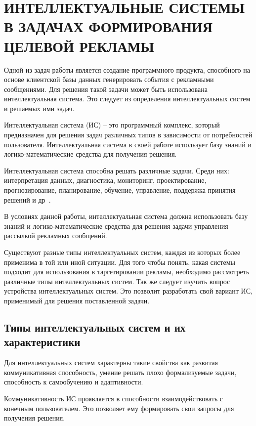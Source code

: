 \chapter{ИНТЕЛЛЕКТУАЛЬНЫЕ СИСТЕМЫ В ЗАДАЧАХ ФОРМИРОВАНИЯ ЦЕЛЕВОЙ РЕКЛАМЫ}

Одной из задач работы является создание программного продукта, способного на основе клиентской базы данных генерировать события с рекламными сообщениями. Для решения такой задачи может быть использована  интеллектуальная система. Это следует из определения интеллектуальных систем и решаемых ими задач.

Интеллектуальная система (ИС) – это программный комплекс, который предназначен для решения задач различных типов в зависимости от потребностей пользователя. Интеллектуальная система в своей работе использует базу знаний и логико-математические средства для получения решения.

Интеллектуальная система способна решать различные задачи. Среди них: интерпретация данных, диагностика, мониторинг, проектирование, прогнозирование, планирование, обучение, управление, поддержка принятия решений и др~\cite{is1}.

В условиях данной работы, интеллектуальная система должна использовать базу знаний и логико-математические средства для решения задачи управления рассылкой рекламных сообщений.

Существуют разные типы интеллектуальных систем, каждая из которых более применима в той или иной ситуации. Для того чтобы понять, какая системы подходит для использования в таргетировании рекламы, необходимо рассмотреть различные типы интеллектуальных систем. Так же следует изучить вопрос устройства интеллектуальных систем. Это позволит разработать свой вариант ИС, применимый для решения поставленной задачи.

\section{Типы интеллектуальных систем и их характеристики}

Для интеллектуальных систем характерны такие свойства как развитая коммуникативная способность, умение решать плохо формализуемые задачи, способность к самообучению и адаптивности.

Коммуникативность ИС проявляется в способности взаимодействовать с конечным пользователем. Это позволяет ему формировать свои запросы для получения решения.

